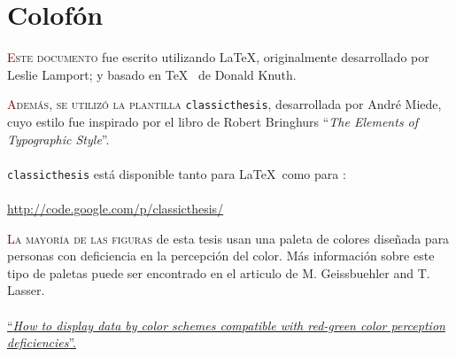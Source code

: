 \pagestyle{empty}
\hfill \vfill

\section*{\hspace*{-40pt}Colofón}
\bigskip

\hspace{-60pt}
\parbox{230pt}{\lettrine[lines=3]{\textcolor{Maroon}{E}}{ste documento} fue escrito utilizando \LaTeX, originalmente desarrollado por Leslie Lamport; y basado en \TeX~ de Donald Knuth.}

\vspace{20pt}
\hspace{-60pt}
\parbox{320pt}{\lettrine[lines=3, slope=1pt]{\textcolor{Maroon}{A}}{demás, se utilizó la plantilla}
\texttt{classicthesis}, desarrollada por Andr\'e Miede, cuyo estilo fue inspirado por el libro de Robert Bringhurs ``\emph{The Elements of Typographic Style}''.
\\~\\
\texttt{classicthesis} está disponible tanto para \LaTeX\ como para \mLyX: \\~\\
\url{http://code.google.com/p/classicthesis/}
}

\vspace{20pt} \hspace{-60pt}
\parbox{410pt}{\lettrine[lines=3]{\textcolor{Maroon}{L}}{a mayoría de las figuras} de esta tesis usan una paleta de colores diseñada para personas con deficiencia en la percepción del color. Más información sobre este tipo de paletas puede ser encontrado en el articulo de M. Geissbuehler and T. Lasser.
\\~\\
\href{http://lob.epfl.ch/page-89396-en.html}{
``\emph{How to display data by color schemes compatible with red-green color perception deficiencies}''.}
}

\bigskip

\noindent\finalVersionString

